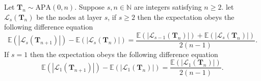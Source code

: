 \documentclass[twoside,11pt]{article}
\theoremstyle{remark}
\begin{document}
\begin{lemma}
\label{lemma difference equation}
Let $\boldsymbol{T}_n\sim \mathrm{APA}(0, n)$.
Suppose $s,n \in \mathbb{N}$ are integers satisfying $n \ge 2$. let $\mathcal{L}_s\left(\boldsymbol{T}_n\right)$ be the nodes at layer $s$,
if $s\geq 2$
then the expectation obeys the following difference equation 
%
\begin{equation*}
\mathbb{E}\left(\left|\mathcal{L}_s\left(\boldsymbol{T}_{n+1}\right)\right|\right)-\mathbb{E}\left(\left|\mathcal{L}_s\left(\boldsymbol{T}_n\right)\right|\right)=\frac{\mathbb{E}\left(\left|\mathcal{L}_{s-1}\left(\boldsymbol{T}_n\right)\right|\right)+\mathbb{E}\left(\left|\mathcal{L}_s\left(\boldsymbol{T}_n\right)\right|\right)}{2 \left(n-1\right)}.
\end{equation*}
%
If $s = 1$ then the expectation obeys the following difference equation 
%
\begin{equation*}
\mathbb{E}\left(\left|\mathcal{L}_1\left(\boldsymbol{T}_{n+1}\right)\right|\right)-\mathbb{E}\left(\left|\mathcal{L}_1\left(\boldsymbol{T}_n\right)\right|\right)=\frac{\mathbb{E}\left(\left|\mathcal{L}_1\left(\boldsymbol{T}_n\right)\right|\right)}{2 \left(n-1\right)}.
\end{equation*}
%
\end{lemma}
\end{document}
